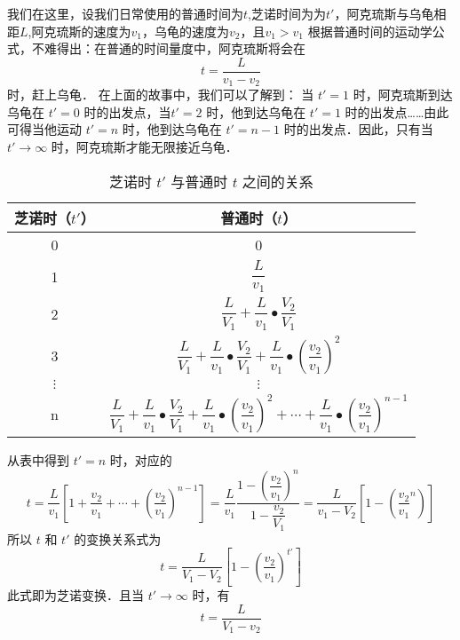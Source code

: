 我们在这里，设我们日常使用的普通时间为$t$,芝诺时间为为$t'$，阿克琉斯与乌龟相距$L$,阿克琉斯的速度为$v_1$，乌龟的速度为$v_2$，且$v_1>v_1$
根据普通时间的运动学公式，不难得出：在普通的时间量度中，阿克琉斯将会在
\begin{equation}
t = \dfrac{L}{v_1 - v_2}
\end{equation}
时，赶上乌龟．
在上面的故事中，我们可以了解到：
当 $t'=1$ 时，阿克琉斯到达乌龟在 $t'=0$ 时的出发点，当$t'=2$ 时，他到达乌龟在 $t'=1$ 时的出发点……由此可得当他运动 $t'=n$ 时，他到达乌龟在 $t'=n-1$ 时的出发点．因此，只有当 $t'\to\infty$ 时，阿克琉斯才能无限接近乌龟．\begin{table}[ht]
\centering
\caption{芝诺时 $t'$ 与普通时 $t$ 之间的关系}\label{zeno_tab1}
\begin{tabular}{|c|c|}
\hline
芝诺时（$t'$） & 普通时（$t$） \\
\hline
0 & 0 \\
\hline
1 & $\dfrac{L}{v_1}$ \\
\hline
2 & $\dfrac{L}{V_1}+\dfrac{L}{v_1}\bullet\dfrac{V_2}{V_1}$ \\
\hline
3 & $\dfrac{L}{V_1}+\dfrac{L}{v_1}\bullet\dfrac{V_2}{V_1}+\dfrac{L}{v_1}\bullet(\dfrac{v_2}{v_1})^2$ \\
\hline
$\vdots$ & $\vdots$ \\
\hline
n & $\dfrac{L}{V_1}+\dfrac{L}{v_1}\bullet\dfrac{V_2}{V_1}+\dfrac{L}{v_1}\bullet(\dfrac{v_2}{v_1})^2+\cdots+\dfrac{L}{v_1}\bullet(\dfrac{v_2}{v_1})^{n-1}$ \\
\hline
\end{tabular}
\end{table}
从表中得到 $t'=n$ 时，对应的
\begin{equation}
t=\dfrac{L}{v_1}[1+\dfrac{v_2}{v_1}+\cdots+(\dfrac{v_2}{v_1})^{n-1}]=\dfrac{L}{v_1}\dfrac{1-(\dfrac{v_2}{v_1})^n}{1-\dfrac{v_2}{V_1}}=\dfrac{L}{v_1-V_2}[1-(\dfrac{v_2}{v_1}^n)]
\end{equation}
所以 $t$ 和 $t'$ 的变换关系式为
\begin{equation}
t=\dfrac{L}{V_1-V_2}[1-(\dfrac{v_2}{v_1})^{t'}]
\end{equation}
此式即为芝诺变换．且当 $t'\to\infty$ 时，有
\begin{equation}
t=\dfrac{L}{V_1-v_2}
\end{equation}